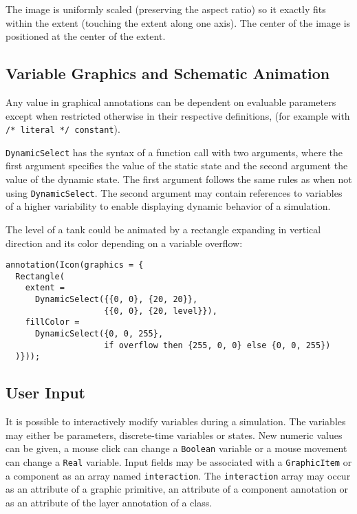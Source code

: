 The image is uniformly scaled (preserving the aspect ratio) so it exactly fits within the extent (touching the extent along one axis).
The center of the image is positioned at the center of the extent.

\subsection{Variable Graphics and Schematic Animation}\label{variable-graphics-and-schematic-animation}

Any value in graphical annotations can be dependent on evaluable parameters except when restricted otherwise in their respective definitions, (for example with \lstinline!/* literal */ constant!).

\lstinline!DynamicSelect! has the syntax of a function call with two arguments, where the first argument specifies the value of the static state and the second argument the value of the dynamic state.
The first argument follows the same rules as when not using \lstinline!DynamicSelect!.
The second argument may contain references to variables of a higher variability to enable displaying dynamic behavior of a simulation.


\begin{example}
The level of a tank could be animated by a rectangle expanding in vertical direction and its color depending on a variable overflow:
\begin{lstlisting}[language=modelica]
annotation(Icon(graphics = {
  Rectangle(
    extent =
      DynamicSelect({{0, 0}, {20, 20}},
                    {{0, 0}, {20, level}}),
    fillColor =
      DynamicSelect({0, 0, 255},
                    if overflow then {255, 0, 0} else {0, 0, 255})
  )}));
\end{lstlisting}
\end{example}

\subsection{User Input}\label{user-input}

It is possible to interactively modify variables during a simulation.
The variables may either be parameters, discrete-time variables or states.
New numeric values can be given, a mouse click can change a \lstinline!Boolean! variable or a mouse movement can change a \lstinline!Real! variable.
Input fields may be associated with a \lstinline!GraphicItem! or a component as an array named \lstinline!interaction!.
The \lstinline!interaction! array may occur as an attribute of a graphic primitive, an attribute of a component annotation or as an attribute of the layer annotation of a class.

